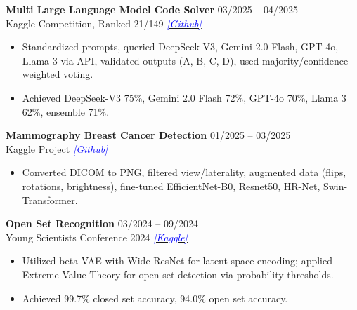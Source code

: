 \documentclass[10pt]{article}
\begin{document}
\textbf{Multi Large Language Model Code Solver} \hfill 03/2025 -- 04/2025 \\
Kaggle Competition, Ranked 21/149  \hfill \href{https://github.com/taitruong256/CodeMMLU}{\textcolor{blue}{\textit{[Github]}}}

\begin{itemize}[noitemsep, topsep=0pt, partopsep=0pt, parsep=0pt]
    \item Standardized prompts, queried DeepSeek-V3, Gemini 2.0 Flash, GPT-4o, Llama 3 via API, validated outputs (A, B, C, D), used majority/confidence-weighted voting.
    \item Achieved DeepSeek-V3 75\%, Gemini 2.0 Flash 72\%, GPT-4o 70\%, Llama 3 62\%, ensemble 71\%.
\end{itemize}


\textbf{Mammography Breast Cancer Detection} \hfill 01/2025 -- 03/2025 \\
Kaggle Project \hfill \href{https://github.com/taitruong256/BreastCancer}{\textcolor{blue}{\textit{[Github]}}}

\begin{itemize}[noitemsep, topsep=0pt, partopsep=0pt, parsep=0pt]
    \item Converted DICOM to PNG, filtered view/laterality, augmented data (flips, rotations, brightness), fine-tuned EfficientNet-B0, Resnet50, HR-Net, Swin-Transformer.
\end{itemize}


\textbf{Open Set Recognition} \hfill 03/2024 -- 09/2024 \\
Young Scientists Conference 2024 \hfill  \href{https://www.kaggle.com/code/taitruong256/openset-recognization-pytorch}{\textcolor{blue}{\textit{[Kaggle]}}}

\begin{itemize}[noitemsep, topsep=0pt, partopsep=0pt, parsep=0pt]
    \item Utilized beta-VAE with Wide ResNet for latent space encoding; applied Extreme Value Theory for open set detection via probability thresholds.
    \item Achieved 99.7\% closed set accuracy, 94.0\% open set accuracy.
\end{itemize}

\begin{center}
    \vspace{0.05cm}
    \hrulefill
    \vspace{0.05cm}
\end{center}
\end{document}
